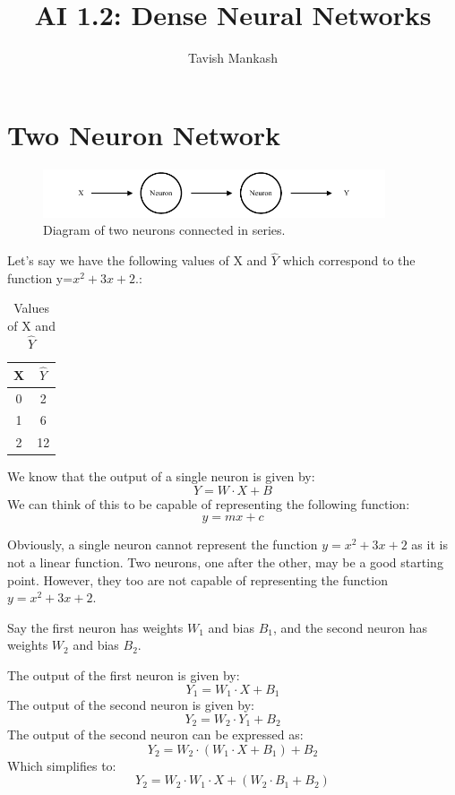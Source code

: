 \documentclass[12pt,a4paper]{article}
\title{AI 1.2: Dense Neural Networks}
\author{Tavish Mankash}
\date{}
\begin{document}
\maketitle

\section{Two Neuron Network}
\begin{figure}[ht]
    \centering
    \includegraphics[width=0.9\textwidth]{../figs/Two_Neuron.drawio.pdf}
    \caption{Diagram of two neurons connected in series.}
    \label{fig:neuron}
\end{figure}

Let's say we have the following values of X and $\hat{Y}$ which correspond to the function y=$x^2 + 3x + 2$.:
\begin{table}[ht]
    \centering
    \begin{tabular}{|c|c|}
        \hline
        X & $\hat{Y}$ \\
        \hline
        0 & 2 \\
        \hline
        1 & 6 \\
        \hline
        2 & 12 \\
        \hline
    \end{tabular}
    \caption{Values of X and $\hat{Y}$}
    \label{tab:x_y_hat}
\end{table}

We know that the output of a single neuron is given by:
\[
    Y = W \cdot X + B
\]
We can think of this to be capable of representing the following function:
\[
    y = mx+c
\]

Obviously, a single neuron cannot represent the function $y=x^2 + 3x + 2$ as it is not a linear function. Two neurons, one after the other, may be a good starting point. However, they too are not capable of representing the function $y=x^2 + 3x + 2$.

Say the first neuron has weights $W_1$ and bias $B_1$, and the second neuron has weights $W_2$ and bias $B_2$. 

The output of the first neuron is given by:
\[
    Y_1 = W_1 \cdot X + B_1
\]
The output of the second neuron is given by:
\[
    Y_2 = W_2 \cdot Y_1 + B_2
\]
The output of the second neuron can be expressed as:
\[
    Y_2 = W_2 \cdot (W_1 \cdot X + B_1) + B_2
\]
Which simplifies to:
\[
    Y_2 = W_2 \cdot W_1 \cdot X + (W_2 \cdot B_1 + B_2)
\]
\end{document}

